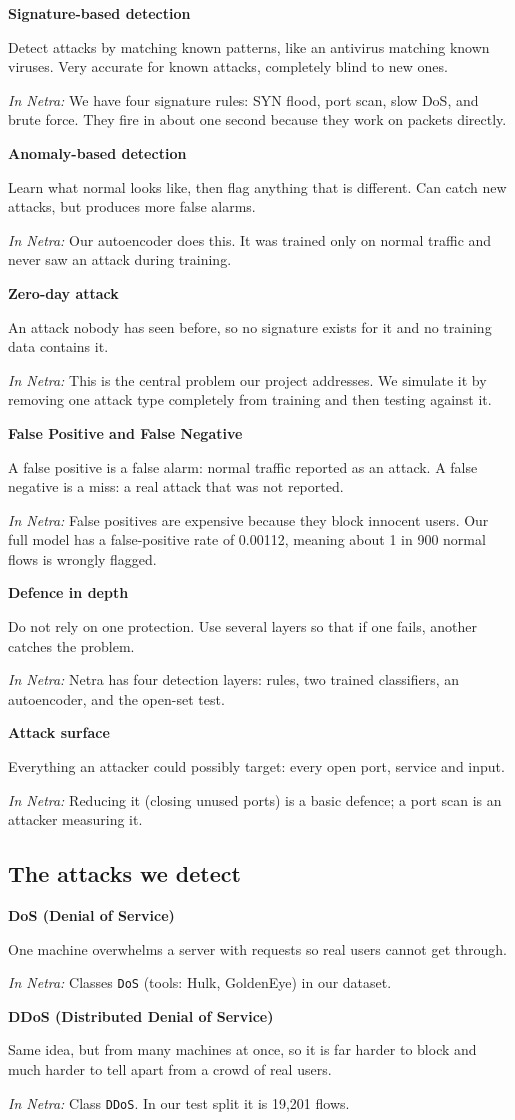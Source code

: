 \documentclass[11pt,a4paper]{article}
\newcommand{\term}[3]{%
  \par\medskip\noindent\textbf{\color{ink}#1}\par
  \nobreak\vspace{1pt}#2\par
  \nobreak\vspace{1pt}\textit{\color{accent}In Netra:} #3\par}
\begin{document}
\term{Signature-based detection}
{Detect attacks by matching known patterns, like an antivirus matching known
viruses. Very accurate for known attacks, completely blind to new ones.}
{We have four signature rules: SYN flood, port scan, slow DoS, and brute force.
They fire in about one second because they work on packets directly.}

\term{Anomaly-based detection}
{Learn what normal looks like, then flag anything that is different. Can catch new
attacks, but produces more false alarms.}
{Our autoencoder does this. It was trained only on normal traffic and never saw an
attack during training.}

\term{Zero-day attack}
{An attack nobody has seen before, so no signature exists for it and no training
data contains it.}
{This is the central problem our project addresses. We simulate it by removing one
attack type completely from training and then testing against it.}

\term{False Positive and False Negative}
{A false positive is a false alarm: normal traffic reported as an attack. A false
negative is a miss: a real attack that was not reported.}
{False positives are expensive because they block innocent users. Our full model
has a false-positive rate of 0.00112, meaning about 1 in 900 normal flows is
wrongly flagged.}

\term{Defence in depth}
{Do not rely on one protection. Use several layers so that if one fails, another
catches the problem.}
{Netra has four detection layers: rules, two trained classifiers, an autoencoder,
and the open-set test.}

\term{Attack surface}
{Everything an attacker could possibly target: every open port, service and
input.}
{Reducing it (closing unused ports) is a basic defence; a port scan is an attacker
measuring it.}

\subsection{The attacks we detect}

\term{DoS (Denial of Service)}
{One machine overwhelms a server with requests so real users cannot get through.}
{Classes \texttt{DoS} (tools: Hulk, GoldenEye) in our dataset.}

\term{DDoS (Distributed Denial of Service)}
{Same idea, but from many machines at once, so it is far harder to block and much
harder to tell apart from a crowd of real users.}
{Class \texttt{DDoS}. In our test split it is 19,201 flows.}
\end{document}
